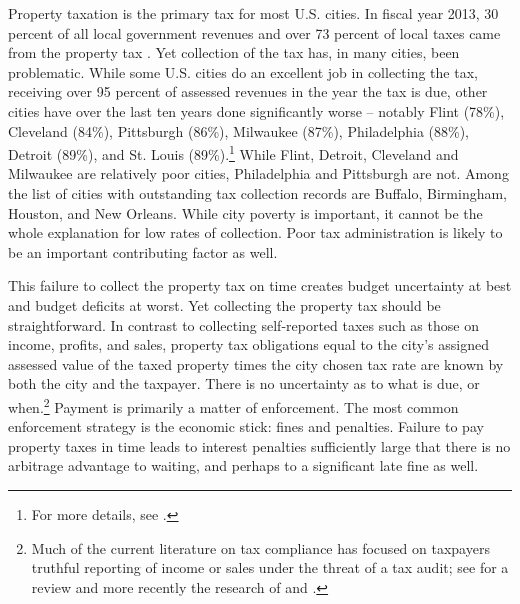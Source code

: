 \documentclass[12pt]{article}
\newcommand{\TAG}[1]{}
\begin{document}
\TAG{BEGIN_INTRO}

Property taxation is the primary tax for most U.S. cities.  In fiscal
year 2013, 30 percent of all local government revenues and over 73
percent of local taxes came from the property tax
\cite{barnett2013state}.  Yet collection of the tax has, in many
cities, been problematic.  While some U.S. cities do an excellent job
in collecting the tax, receiving over 95 percent of assessed revenues
in the year the tax is due, other cities have over the last ten years
done significantly worse -- notably Flint (78\%), Cleveland (84\%),
Pittsburgh (86\%), Milwaukee (87\%), Philadelphia (88\%), Detroit
(89\%), and St. Louis (89\%).\footnote{For more details, see
  .}  While Flint, Detroit, Cleveland and Milwaukee
are relatively poor cities, Philadelphia and Pittsburgh are not.
Among the list of cities with outstanding tax collection records are
Buffalo, Birmingham, Houston, and New Orleans.  While city poverty is
important, it cannot be the whole explanation for low rates of
collection.  Poor tax administration is likely to be an important
contributing factor as well.

This failure to collect the property tax on time creates budget
uncertainty at best and budget deficits at worst.  Yet collecting the
property tax should be straightforward.  In contrast to collecting
self-reported taxes such as those on income, profits, and sales,
property tax obligations equal to the city's assigned assessed value
of the taxed property times the city chosen tax rate are known by both
the city and the taxpayer.  There is no uncertainty as to what is due,
or when.\footnote{Much of the current literature on tax compliance has
  focused on taxpayers truthful reporting of income or sales under the
  threat of a tax audit; see  for a review and more
  recently the research of  and .}
Payment is primarily a matter of enforcement.  The most common
enforcement strategy is the economic stick: fines and penalties.
Failure to pay property taxes in time leads to interest penalties
sufficiently large that there is no arbitrage advantage to waiting,
and perhaps to a significant late fine as well.
\end{document}
